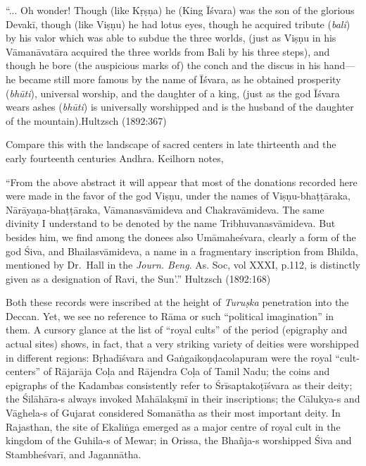 \begin{myquote}
“...  Oh wonder! Though (like Kṛṣṇa) he (King Īśvara) was the son of the glorious Devakī, though (like Viṣṇu) he had lotus eyes, though he acquired tribute ({\sl bali}) by his valor which was able to subdue the three worlds, (just as Viṣṇu in his Vāmanāvatāra acquired the three worlds from Bali by his three steps), and though he bore (the auspicious marks of) the conch and the discus in his hand— he became still more famous by the name of Īśvara, as he obtained prosperity ({\sl bhūti}), universal worship, and the daughter of a king, (just as the god Īśvara wears ashes ({\sl bhūti}) is universally worshipped and is the husband of the daughter of the mountain).\hfill Hultzsch (1892:367)
\end{myquote}

Compare this with the landscape of sacred centers in late thirteenth and the early fourteenth centuries Andhra. Keilhorn notes, 

\begin{myquote}
“From the above abstract it will appear that most of the donations recorded here were made in the favor of the god Viṣṇu, under the names of Viṣṇu-bhaṭṭāraka, Nārāyaṇa-bhaṭṭāraka, Vāmanasvāmideva and Chakravāmideva. The same divinity I understand to be denoted by the name Tribhuvanasvāmideva. But besides him, we find among the donees also Umāmaheśvara, clearly a form of the god Śiva, and Bhailasvāmideva, a name in a fragmentary inscription from Bhilda, mentioned by Dr.~Hall in the {\sl Journ. Beng}. As. Soc, vol XXXI, p.112, is distinctly given as a designation of Ravi, the Sun’.”
\hfill Hultzsch  (1892:168)
\end{myquote}

Both these records were inscribed at the height of {\sl Turuṣka} penetration into the Deccan. Yet, we see no reference to Rāma or such “political imagination” in them. A cursory glance at the list of “royal cults” of the period (epigraphy and actual sites) shows, in fact, that a very striking variety of deities were worshipped in different regions: Bṛhadīśvara and Gaṅgaikoṇḍacolapuram were the royal “cult-centers” of Rājarāja Coḷa and Rājendra Coḷa of Tamil Nadu; the coins and epigraphs of the Kadambas consistently refer to Śrīsaptakoṭīśvara as their deity; the Śilāhāra-s always invoked Mahālakṣmī in their inscriptions; the Cālukya-s and Vāghela-s of Gujarat considered Somanātha as their most important deity. In Rajasthan, the site of Ekaliṅga emerged as a major centre of royal cult in the kingdom of the Guhila-s of Mewar; in Orissa, the Bhañja-s worshipped Śiva and Stambheśvarī, and Jagannātha.

